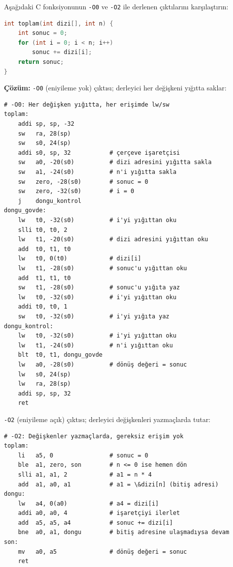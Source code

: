 \begin{ornek}[4.16]
\label{orn:eniyileme}
Aşağıdaki C fonksiyonunun \texttt{-O0} ve \texttt{-O2} ile derlenen çıktılarını karşılaştırın:

\begin{lstlisting}[language=C, style=alistirma-kod]
int toplam(int dizi[], int n) {
    int sonuc = 0;
    for (int i = 0; i < n; i++)
        sonuc += dizi[i];
    return sonuc;
}
\end{lstlisting}

\textbf{Çözüm:} \texttt{-O0} (eniyileme yok) çıktısı; derleyici her değişkeni yığıtta saklar:

\begin{lstlisting}[style=riscv]
# -O0: Her değişken yığıtta, her erişimde lw/sw
toplam:
    addi sp, sp, -32
    sw   ra, 28(sp)
    sw   s0, 24(sp)
    addi s0, sp, 32           # çerçeve işaretçisi
    sw   a0, -20(s0)          # dizi adresini yığıtta sakla
    sw   a1, -24(s0)          # n'i yığıtta sakla
    sw   zero, -28(s0)        # sonuc = 0
    sw   zero, -32(s0)        # i = 0
    j    dongu_kontrol
dongu_govde:
    lw   t0, -32(s0)          # i'yi yığıttan oku
    slli t0, t0, 2
    lw   t1, -20(s0)          # dizi adresini yığıttan oku
    add  t0, t1, t0
    lw   t0, 0(t0)            # dizi[i]
    lw   t1, -28(s0)          # sonuc'u yığıttan oku
    add  t1, t1, t0
    sw   t1, -28(s0)          # sonuc'u yığıta yaz
    lw   t0, -32(s0)          # i'yi yığıttan oku
    addi t0, t0, 1
    sw   t0, -32(s0)          # i'yi yığıta yaz
dongu_kontrol:
    lw   t0, -32(s0)          # i'yi yığıttan oku
    lw   t1, -24(s0)          # n'i yığıttan oku
    blt  t0, t1, dongu_govde
    lw   a0, -28(s0)          # dönüş değeri = sonuc
    lw   s0, 24(sp)
    lw   ra, 28(sp)
    addi sp, sp, 32
    ret
\end{lstlisting}

\texttt{-O2} (eniyileme açık) çıktısı; derleyici değişkenleri yazmaçlarda tutar:

\begin{lstlisting}[style=riscv]
# -O2: Değişkenler yazmaçlarda, gereksiz erişim yok
toplam:
    li   a5, 0                # sonuc = 0
    ble  a1, zero, son        # n <= 0 ise hemen dön
    slli a1, a1, 2            # a1 = n * 4
    add  a1, a0, a1           # a1 = \&dizi[n] (bitiş adresi)
dongu:
    lw   a4, 0(a0)            # a4 = dizi[i]
    addi a0, a0, 4            # işaretçiyi ilerlet
    add  a5, a5, a4           # sonuc += dizi[i]
    bne  a0, a1, dongu        # bitiş adresine ulaşmadıysa devam
son:
    mv   a0, a5               # dönüş değeri = sonuc
    ret
\end{lstlisting}


\end{ornek}
